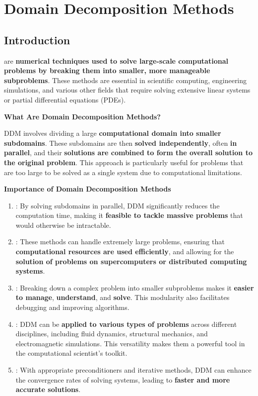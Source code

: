 \section{Domain Decomposition Methods}

\subsection{Introduction}

 are \textbf{numerical techniques used to solve large-scale computational problems by breaking them into smaller, more manageable subproblems}. These methods are essential in scientific computing, engineering simulations, and various other fields that require solving extensive linear systems or partial differential equations (PDEs).

\highspace
\begin{flushleft}
    \textcolor{Green3}{ \textbf{What Are Domain Decomposition Methods?}}
\end{flushleft}
DDM involves dividing a large \textbf{computational domain into smaller subdomains}. These subdomains are then \textbf{solved independently}, often \textbf{in parallel}, and their \textbf{solutions are combined to form the overall solution to the original problem}. This approach is particularly useful for problems that are too large to be solved as a single system due to computational limitations.

\highspace
\begin{flushleft}
    \textcolor{Red2}{ \textbf{Importance of Domain Decomposition Methods}}
\end{flushleft}
\begin{enumerate}
    \item {}: By solving subdomains in parallel, DDM significantly reduces the computation time, making it \textbf{feasible to tackle massive problems} that would otherwise be intractable.
    \item {}: These methods can handle extremely large problems, ensuring that \textbf{computational resources are used efficiently}, and allowing for the \textbf{solution of problems on supercomputers or distributed computing systems}.
    \item {}: Breaking down a complex problem into smaller subproblems makes it \textbf{easier to manage}, \textbf{understand}, and \textbf{solve}. This modularity also facilitates debugging and improving algorithms.
    \item {}: DDM can be \textbf{applied to various types of problems} across different disciplines, including fluid dynamics, structural mechanics, and electromagnetic simulations. This versatility makes them a powerful tool in the computational scientist's toolkit.
    \item {}: With appropriate preconditioners and iterative methods, DDM can enhance the convergence rates of solving systems, leading to \textbf{faster and more accurate solutions}.
\end{enumerate}
